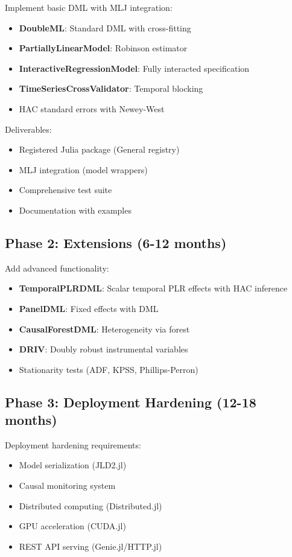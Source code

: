 Implement basic DML with MLJ integration:

\begin{itemize}
    \item \textbf{DoubleML}: Standard DML with cross-fitting
    \item \textbf{PartiallyLinearModel}: Robinson estimator
    \item \textbf{InteractiveRegressionModel}: Fully interacted specification
    \item \textbf{TimeSeriesCrossValidator}: Temporal blocking
    \item HAC standard errors with Newey-West
\end{itemize}

Deliverables:
\begin{itemize}
    \item Registered Julia package (General registry)
    \item MLJ integration (model wrappers)
    \item Comprehensive test suite
    \item Documentation with examples
\end{itemize}

\subsection{Phase 2: Extensions (6-12 months)}

Add advanced functionality:

\begin{itemize}
    \item \textbf{TemporalPLRDML}: Scalar temporal PLR effects with HAC inference
    \item \textbf{PanelDML}: Fixed effects with DML
    \item \textbf{CausalForestDML}: Heterogeneity via forest
    \item \textbf{DRIV}: Doubly robust instrumental variables
    \item Stationarity tests (ADF, KPSS, Phillips-Perron)
\end{itemize}

\subsection{Phase 3: Deployment Hardening (12-18 months)}

Deployment hardening requirements:

\begin{itemize}
    \item Model serialization (JLD2.jl)
    \item Causal monitoring system
    \item Distributed computing (Distributed.jl)
    \item GPU acceleration (CUDA.jl)
    \item REST API serving (Genie.jl/HTTP.jl)
\end{itemize}

